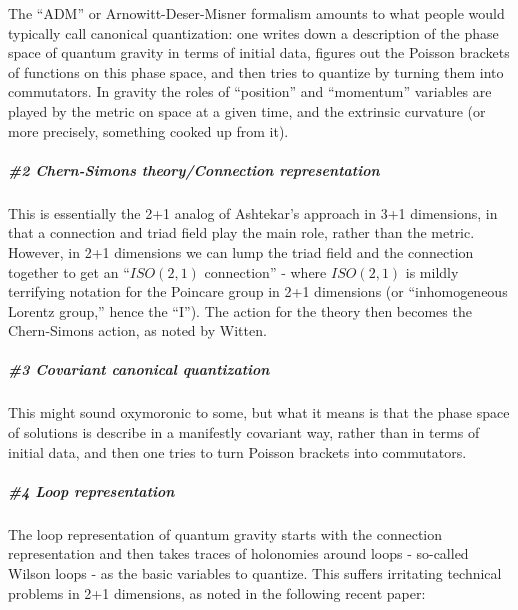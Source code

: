 \documentclass{article}
\def\tightlist{}
\renewcommand{\texttt}[1]{%
  \begingroup
  \ttfamily
  \begingroup\lccode`~=`/\lowercase{\endgroup\def~}{/\discretionary{}{}{}}%
  \begingroup\lccode`~=`[\lowercase{\endgroup\def~}{[\discretionary{}{}{}}%
  \begingroup\lccode`~=`.\lowercase{\endgroup\def~}{.\discretionary{}{}{}}%
  \catcode`/=\active\catcode`[=\active\catcode`.=\active
  \scantokens{#1\noexpand}%
  \endgroup
}
\begin{document}
The ``ADM'' or Arnowitt-Deser-Misner formalism amounts to what people
would typically call canonical quantization: one writes down a
description of the phase space of quantum gravity in terms of initial
data, figures out the Poisson brackets of functions on this phase space,
and then tries to quantize by turning them into commutators. In gravity
the roles of ``position'' and ``momentum'' variables are played by the
metric on space at a given time, and the extrinsic curvature (or more
precisely, something cooked up from it).

\hypertarget{chern-simons-theoryconnection-representation}{%
\subparagraph{\#2 Chern-Simons theory/Connection
representation}\label{chern-simons-theoryconnection-representation}}

This is essentially the 2+1 analog of Ashtekar's approach in 3+1
dimensions, in that a connection and triad field play the main role,
rather than the metric. However, in 2+1 dimensions we can lump the triad
field and the connection together to get an ``\(ISO(2,1)\) connection''
- where \(ISO(2,1)\) is mildly terrifying notation for the Poincare
group in 2+1 dimensions (or ``inhomogeneous Lorentz group,'' hence the
``I''). The action for the theory then becomes the Chern-Simons action,
as noted by Witten.

\hypertarget{covariant-canonical-quantization}{%
\subparagraph{\#3 Covariant canonical
quantization}\label{covariant-canonical-quantization}}

This might sound oxymoronic to some, but what it means is that the phase
space of solutions is describe in a manifestly covariant way, rather
than in terms of initial data, and then one tries to turn Poisson
brackets into commutators.

\hypertarget{loop-representation}{%
\subparagraph{\#4 Loop representation}\label{loop-representation}}

The loop representation of quantum gravity starts with the connection
representation and then takes traces of holonomies around loops -
so-called Wilson loops - as the basic variables to quantize. This
suffers irritating technical problems in 2+1 dimensions, as noted in the
following recent paper:

\end{document}
